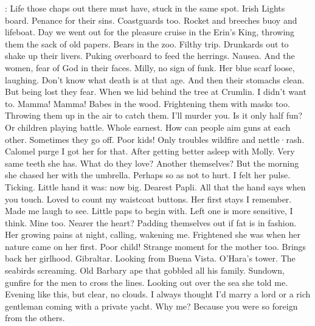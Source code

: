 \Bloom:
Life those chaps out there
must have,
stuck in the same spot.
Irish Lights board.
Penance for their sins.
Coastguards too.
Rocket and breeches
buoy and lifeboat.
Day we went out for the pleasure cruise
in the Erin's King,
throwing them the sack of old papers.
Bears in the zoo.
Filthy trip.
Drunkards out to shake up their livers.
Puking overboard to feed the herrings.
Nausea.
And the women,
fear of God in their faces.
Milly,
no sign of funk.
Her blue scarf loose,
laughing.
Don't know what death is
at that age.
And then their stomachs clean.
But being lost
they fear.
When we hid behind the tree at Crumlin.
I didn't want to.
Mamma!
Mamma!
Babes in the wood.
Frightening them with masks too.
Throwing them up in the air
to catch them.
I'll murder you.
Is it only half fun?
Or children playing battle.
Whole earnest.
How can people aim guns at each other.
Sometimes they go off.
Poor kids!
Only troubles wildfire
and nettle·rash.
Calomel purge
I got her
for that.
After getting better
asleep with Molly.
Very same teeth
she has.
What do they love?
Another
themselves?
But the morning
she chased her with the umbrella.
Perhaps so as
not to hurt.
I felt her pulse.
Ticking.
Little hand
it was:
now big.
Dearest Papli.
All that the hand says
when you touch.
Loved to count my waistcoat buttons.
Her first stays
I remember.
Made me laugh to see.
Little paps to begin with.
Left one is more sensitive,
I think.
Mine too.
Nearer the heart?
Padding themselves out
if fat is in fashion.
Her growing pains at night,
calling,
wakening me.
Frightened she was
when her nature came on her first.
Poor child!
Strange moment for the mother too.
Brings back her girlhood.
Gibraltar.
Looking from Buena Vista.
O'Hara's tower.
The seabirds screaming.
Old Barbary ape that gobbled all his family.
Sundown,
gunfire for the men to cross the lines.
Looking out over the sea
she told me.
Evening like this,
but clear,
no clouds.
I always thought
I'd marry a lord
or a rich gentleman coming with a private yacht.
Why me?
Because you were so foreign
from the others.

